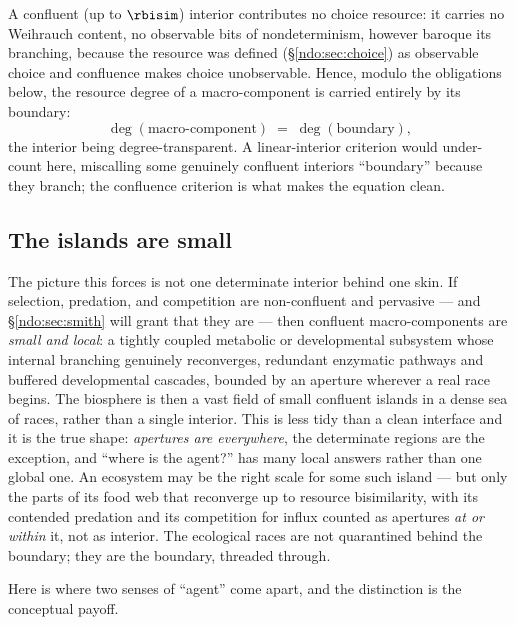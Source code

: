 \begin{proposition}\label{ndo:prop:degree}
A confluent (up to $\rbisim$) interior contributes no choice resource: it carries
no Weihrauch content, no observable bits of nondeterminism, however baroque its
branching, because the resource was defined (\S\ref{ndo:sec:choice}) as observable
choice and confluence makes choice unobservable. Hence, modulo the obligations
below, the resource degree of a macro-component is carried entirely by its
boundary:
\[
\deg(\text{macro-component}) \;=\; \deg(\text{boundary}),
\]
the interior being degree-transparent. A linear-interior criterion would
under-count here, miscalling some genuinely confluent interiors ``boundary''
because they branch; the confluence criterion is what makes the equation clean.
\end{proposition}


\subsection{The islands are small}

The picture this forces is not one determinate interior behind one skin. If
selection, predation, and competition are non-confluent and pervasive --- and
\S\ref{ndo:sec:smith} will grant that they are --- then confluent macro-components are
\emph{small and local}: a tightly coupled metabolic or developmental subsystem whose
internal branching genuinely reconverges, redundant enzymatic pathways and buffered
developmental cascades, bounded by an aperture wherever a real race begins. The
biosphere is then a vast field of small confluent islands in a dense sea of races,
rather than a single interior. This is less tidy than a clean interface and it is the
true shape: \emph{apertures are everywhere}, the determinate regions are the exception,
and ``where is the agent?'' has many local answers rather than one global one. An
ecosystem may be the right scale for some such island --- but only the parts of its food
web that reconverge up to resource bisimilarity, with its contended predation and its
competition for influx counted as apertures \emph{at or within} it, not as interior. The
ecological races are not quarantined behind the boundary; they are the boundary,
threaded through.

Here is where two senses of ``agent'' come apart, and the distinction is the conceptual
payoff.

